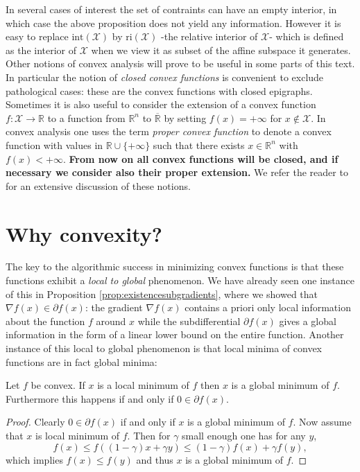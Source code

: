 \documentclass[openany]{now}
\newcommand{\R}{\mathbb{R}}
\newcommand{\cX}{\mathcal{X}}
\begin{document}
In several cases of interest the set of contraints can have an empty interior, in which case the above proposition does not yield any information. However it is easy to replace $\mathrm{int}(\cX)$ by $\mathrm{ri}(\cX)$ -the relative interior of $\cX$- which is defined as the interior of $\cX$ when we view it as subset of the affine subspace it generates. Other notions of convex analysis will prove to be useful in some parts of this text. In particular the notion of {\em closed convex functions} is convenient to exclude pathological cases: these are the convex functions with closed epigraphs. Sometimes it is also useful to consider the extension of a convex function $f: \cX \rightarrow \R$ to a function from $\R^n$ to $\overline{\R}$ by setting $f(x)= + \infty$ for $x \not\in \cX$. In convex analysis one uses the term {\em proper convex function} to denote a convex function with values in $\R \cup \{+\infty\}$ such that there exists $x \in \R^n$ with $f(x) < +\infty$. \textbf{From now on all convex functions will be closed, and if necessary we consider also their proper extension.} We refer the reader to \cite{Roc70} for an extensive discussion of these notions.

\section{Why convexity?}
The key to the algorithmic success in minimizing convex functions is that these functions exhibit a {\em local to global} phenomenon. We have already seen one instance of this in Proposition \ref{prop:existencesubgradients}, where we showed that $\nabla f(x) \in \partial f(x)$: the gradient $\nabla f(x)$ contains a priori only local information about the function $f$ around $x$ while the subdifferential $\partial f(x)$ gives a global information in the form of a linear lower bound on the entire function. Another instance of this local to global phenomenon is that local minima of convex functions are in fact global minima:

\begin{proposition}
Let $f$ be convex. If $x$ is a local minimum of $f$ then $x$ is a global minimum of $f$. Furthermore this happens if and only if $0 \in \partial f(x)$.
\end{proposition}

\begin{proof}
Clearly $0 \in \partial f(x)$ if and only if $x$ is a global minimum of $f$. Now assume that $x$ is local minimum of $f$. Then for $\gamma$ small enough one has for any $y$,
$$f(x) \leq f((1-\gamma) x + \gamma y) \leq (1-\gamma) f(x) + \gamma f(y) ,$$
which implies $f(x) \leq f(y)$ and thus $x$ is a global minimum of $f$.
\end{proof}
\end{document}
